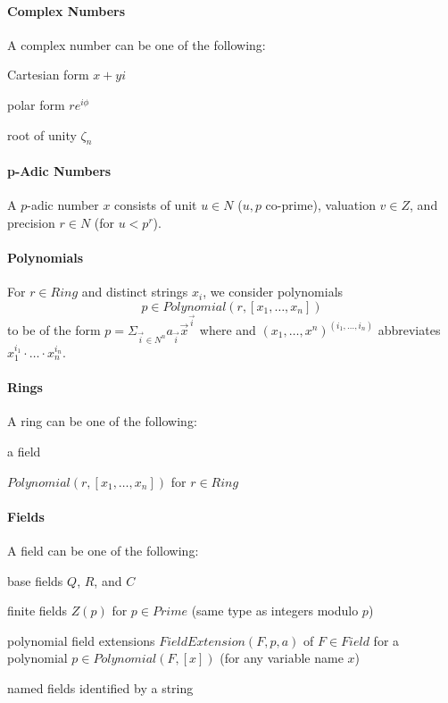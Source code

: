 \paragraph{Complex Numbers}
A complex number can be one of the following:
\begin{compactitem}
 \item Cartesian form $x+yi$
 \item polar form $r e^{i\phi}$
 \item root of unity $\zeta_n$
\end{compactitem}

\paragraph{p-Adic Numbers}
A $p$-adic number $x$ consists of unit $u\in N$ ($u,p$ co-prime), valuation $v\in Z$, and precision $r\in N$ (for $u<p^r$).

\paragraph{Polynomials}
For $r\in Ring$ and distinct strings $x_i$, we consider polynomials
\[p\in Polynomial(r,[x_1,\ldots,x_n])\]
to be of the form $p=\Sigma_{\vec{i}\in N^n} a_{\vec{i}} \vec{x}^{\vec{i}}$ where and $(x_1,\ldots,x^n)^{(i_1,\ldots,i_n)}$ abbreviates $x_1^{i_1}\cdot \ldots\cdot x_n^{i_n}$.

\paragraph{Rings}
A ring can be one of the following:
\begin{compactitem}
 \item a field
 \item $Polynomial(r,[x_1,\ldots,x_n])$ for $r\in Ring$
\end{compactitem}

\paragraph{Fields}
A field can be one of the following:
\begin{compactitem}
 \item base fields $Q$, $R$, and $C$
 \item finite fields $Z(p)$ for $p\in Prime$ (same type as integers modulo $p$)
 \item polynomial field extensions $FieldExtension(F,p,a)$ of $F\in Field$ for a polynomial $p\in Polynomial(F,[x])$ (for any variable name $x$)
 \item named fields identified by a string
\end{compactitem}

